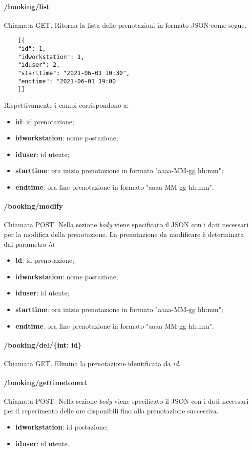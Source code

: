 \paragraph{/booking/list}
Chiamata GET. Ritorna la lista delle prenotazioni in formato JSON come segue.	\\
\begin{center}
	\begin{lstlisting}
	[{
	"id": 1,
	"idworkstation": 1,
	"iduser": 2,
	"starttime": "2021-06-01 10:30",
	"endtime": "2021-06-01 19:00"
	}]
	\end{lstlisting}
\end{center}
Rispettivamente i campi corrispondono a:
\begin{itemize}
	\item \textbf{id}: id prenotazione;
	\item \textbf{idworkstation}: nome postazione;
	\item \textbf{iduser}: id utente;
	\item \textbf{starttime}: ora inizio prenotazione in formato "aaaa-MM-gg hh:mm";
	\item \textbf{endtime}: ora fine prenotazione in formato "aaaa-MM-gg hh:mm".	
\end{itemize}
\paragraph{/booking/modify}
Chiamata POST. Nella sezione \textit{body} viene specificato il JSON con i dati necessari per la modifica della prenotazione. La prenotazione da modificare è determinata dal parametro \textit{id}:
\begin{itemize}
	\item \textbf{id}: id prenotazione;
	\item \textbf{idworkstation}: nome postazione;
	\item \textbf{iduser}: id utente;
	\item \textbf{starttime}: ora inizio prenotazione in formato "aaaa-MM-gg hh:mm";
	\item \textbf{endtime}: ora fine prenotazione in formato "aaaa-MM-gg hh:mm".	
\end{itemize}
\paragraph{/booking/del/\{int: id\}}
Chiamata GET. Elimina la prenotazione identificata da \textit{id}.
\paragraph{/booking/gettimetonext}
Chiamata POST. Nella sezione \textit{body} viene specificato il JSON con i dati necessari per il reperimento delle ore disponibili fino alla prenotazione successiva.
\begin{itemize}
	\item \textbf{idworkstation}: id postazione;
	\item \textbf{iduser}: id utente.
\end{itemize}

